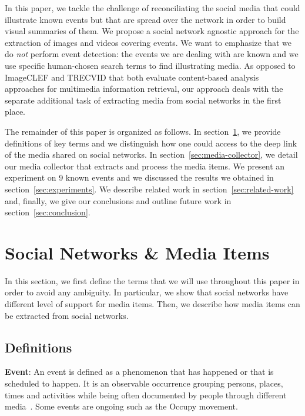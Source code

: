 \documentclass{acm_proc_article-sp}
\let\oldemph\emph
\renewcommand{\emph}[1]{\oldemph{\fontsize{9}{9}\selectfont #1}}
\begin{document}
In this paper, we tackle the challenge of reconciliating the social media that could illustrate known events but that 
are spread over the network in order to build visual summaries of them. We propose a social network agnostic 
approach for the extraction of images and videos covering events. We want to emphasize that we do \emph{not} perform 
event detection: the events we are dealing with are known and we use specific human-chosen search terms to find illustrating 
media. As opposed to \mbox{ImageCLEF} and \mbox{TRECVID} that both evaluate content-based analysis approaches for 
multimedia information retrieval, our approach deals with the separate additional task of extracting media from social networks 
in the first place. 

The remainder of this paper is organized as follows. In section~\ref{sec:social-networks}, we provide definitions of key terms
and we distinguish how one could access to the deep link of the media shared on social networks. In section~\ref{sec:media-collector},
we detail our media collector that extracts and process the media items. We present an experiment on 9 known events and we 
discussed the results we obtained in section~\ref{sec:experiments}. We describe related work in section~\ref{sec:related-work} and, 
finally, we give our conclusions and outline future work in section~\ref{sec:conclusion}.


\section{Social Networks \& Media Items}                                    \label{sec:social-networks}
In this section, we first define the terms that we will use throughout this paper in order to avoid any ambiguity. In particular, we show that social networks have different level of support for media items. Then, we describe how media items can be extracted from social networks.

\subsection{Definitions}
\textbf{Event}: An event is defined as a phenomenon that has happened or that is scheduled to happen. It is an observable occurrence grouping
persons, places, times and activities while being often documented by people through different media~\cite{Liu:ICMR11}. Some events
are ongoing such as the Occupy movement.
\end{document}
